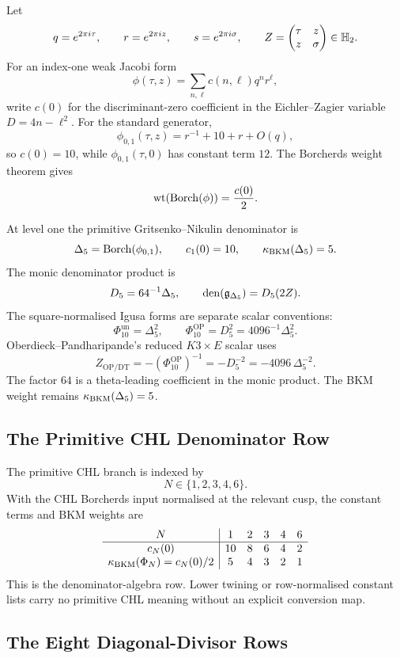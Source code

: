 Let
\[
        q=e^{2\pi i\tau},\qquad r=e^{2\pi iz},\qquad
        s=e^{2\pi i\sigma},\qquad
        Z=\begin{pmatrix}\tau&z\\ z&\sigma\end{pmatrix}\in\mathbb{H}_2 .
\]
For an index-one weak Jacobi form
\[
        \phi(\tau,z)=\sum_{n,\ell}c(n,\ell)q^nr^\ell ,
\]
write \(c(0)\) for the discriminant-zero coefficient in the
Eichler--Zagier variable \(D=4n-\ell^2\).  For the standard generator,
\[
        \phi_{0,1}(\tau,z)=r^{-1}+10+r+O(q),
\]
so \(c(0)=10\), while \(\phi_{0,1}(\tau,0)\) has constant term \(12\).
The Borcherds weight theorem gives
\[
        \mathrm{wt}(\mathrm{Borch}(\phi))=\frac{c(0)}{2}.
\]

At level one the primitive Gritsenko--Nikulin denominator is
\[
        \Delta_5=\mathrm{Borch}(\phi_{0,1}),\qquad
        c_1(0)=10,\qquad
        \kappa_{\mathrm{BKM}}(\Delta_5)=5 .
\]
The monic denominator product is
\[
        D_5=64^{-1}\Delta_5,\qquad
        \operatorname{den}(\mathfrak{g}_{\Delta_5})=D_5(2Z).
\]
The square-normalised Igusa forms are separate scalar conventions:
\[
        \Phi_{10}^{\mathrm{un}}=\Delta_5^2,\qquad
        \Phi_{10}^{\mathrm{OP}}=D_5^2=4096^{-1}\Delta_5^2 .
\]
Oberdieck--Pandharipande's reduced \(K3\times E\) scalar uses
\[
        Z_{\mathrm{OP/DT}}=-(\Phi_{10}^{\mathrm{OP}})^{-1}
        =-D_5^{-2}=-4096\,\Delta_5^{-2}.
\]
The factor \(64\) is a theta-leading coefficient in the monic product.
The BKM weight remains \(\kappa_{\mathrm{BKM}}(\Delta_5)=5\).

\subsection*{The Primitive CHL Denominator Row}
\label{sec:frontier-chl-row}

The primitive CHL branch is indexed by
\[
        N\in\{1,2,3,4,6\}.
\]
With the CHL Borcherds input normalised at the relevant cusp, the
constant terms and BKM weights are
\[
\begin{array}{c|ccccc}
N & 1 & 2 & 3 & 4 & 6\\
\hline
c_N(0) & 10 & 8 & 6 & 4 & 2\\
\kappa_{\mathrm{BKM}}(\Phi_N)=c_N(0)/2 & 5 & 4 & 3 & 2 & 1
\end{array}
\]
This is the denominator-algebra row.  Lower twining or row-normalised
constant lists carry no primitive CHL meaning without an explicit
conversion map.

\subsection*{The Eight Diagonal-Divisor Rows}
\label{sec:frontier-gc-table}

